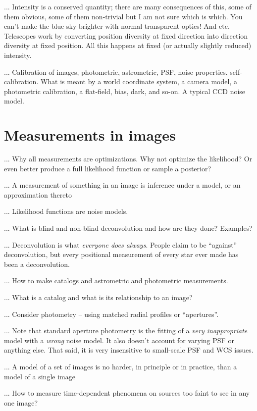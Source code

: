 \documentclass[12pt,twoside,pdftex]{article}
\begin{document}
... Intensity is a conserved quantity; there are many consequences of
this, some of them obvious, some of them non-trivial but I am not sure
which is which.  You can't make the blue sky brighter with normal
transparent optics!  And etc.  Telescopes work by converting position
diversity at fixed direction into direction diversity at fixed
position.  All this happens at fixed (or actually slightly reduced)
intensity.

... Calibration of images, photometric, astrometric, PSF, noise
properties.  self-calibration.  What is meant by a world coordinate
system, a camera model, a photometric calibration, a flat-field, bias,
dark, and so-on.  A typical CCD noise model.

\section{Measurements in images}

... Why all measurements are optimizations.  Why not optimize the
likelihood?  Or even better produce a full likelihood function or
sample a posterior?

... A measurement of something in an image is inference under a model,
or an approximation thereto

... Likelihood functions are noise models.

... What is blind and non-blind deconvolution and how are they done?
Examples?
 
... Deconvolution is what \emph{everyone does always}.  People claim
to be ``against'' deconvolution, but every positional measurement of
every star ever made has been a deconvolution.

... How to make catalogs and astrometric and photometric measurements.

... What is a catalog and what is its relationship to an image?

... Consider photometry -- using matched radial profiles or
``apertures''.

... Note that standard aperture photometry is the fitting of a
\emph{very inappropriate} model with a \emph{wrong} noise model.  It
also doesn't account for varying PSF or anything else.  That said, it
is very insensitive to small-scale PSF and WCS issues.

... A model of a set of images is no harder, in principle or in
practice, than a model of a single image

... How to measure time-dependent phenomena on sources too faint to
see in any one image?
\end{document}
